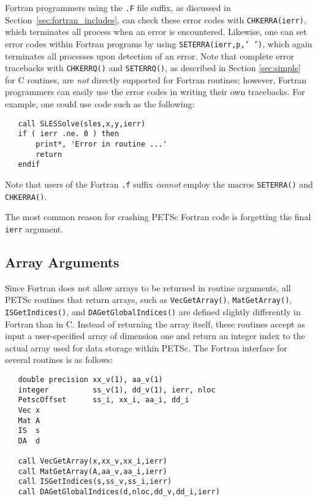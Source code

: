Fortran programmers using the {\tt .F} file suffix, as discussed in
Section~\ref{sec:fortran_includes}, can check these error codes with
{\tt CHKERRA(ierr)}, which terminates all process when an error is
encountered.  Likewise, one can set error codes within Fortran programs by
using {\tt SETERRA(ierr,p,' ')}, which again terminates all processes
upon detection of an error.  
Note that complete error tracebacks with
{\tt CHKERRQ()} and {\tt SETERRQ()}, as described in Section
\ref{sec:simple} for C routines, are {\em not} directly supported for
Fortran routines; however, Fortran programmers can easily use the
error codes in writing their own tracebacks.  For example, one could
use code such as the following:
\begin{verbatim}
   call SLESSolve(sles,x,y,ierr)
   if ( ierr .ne. 0 ) then
       print*, 'Error in routine ...'
       return
   endif
\end{verbatim}
Note that users of the Fortran {\tt .f} suffix {\em cannot} employ the
macros {\tt SETERRA()} and {\tt CHKERRA()}.

The most common reason for crashing PETSc Fortran code is forgetting the 
final {\tt ierr} argument.

\subsection{Array Arguments}
\label{sec:fortranarrays}

Since Fortran does not allow arrays to be returned in routine
arguments, all PETSc routines that return arrays, such as 
{\tt VecGetArray()}, {\tt MatGetArray()}, 
{\tt ISGetIndices()}, and {\tt DAGetGlobalIndices()}
are defined slightly differently in Fortran than in C.  
  
 
Instead of returning the array itself, these routines
accept as input a user-specified array of dimension one and return an
integer index to the actual array used for data storage within PETSc.
The Fortran interface for several routines is as follows:
\begin{verbatim}
   double precision xx_v(1), aa_v(1)
   integer          ss_v(1), dd_v(1), ierr, nloc
   PetscOffset      ss_i, xx_i, aa_i, dd_i
   Vec x
   Mat A
   IS  s
   DA  d

   call VecGetArray(x,xx_v,xx_i,ierr)
   call MatGetArray(A,aa_v,aa_i,ierr)
   call ISGetIndices(s,ss_v,ss_i,ierr)
   call DAGetGlobalIndices(d,nloc,dd_v,dd_i,ierr)
\end{verbatim}

